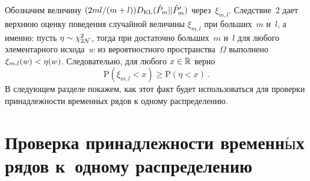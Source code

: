 \begin{multicols}{2}
Обозначим величину $(2ml/(m+l))D_{\mathrm{KL}}(\hat{P}_m||\hat{P}'_m)$ через~$\xi_{m,l}$.
Следствие~2 дает верхнюю оценку поведения случайной величины $\xi_{m,l}$ при
больших~$m$ и~$l$, а именно: пусть $\eta\hm\sim \chi_{2\mathcal{N}}^2$, тогда при
достаточно больших~$m$ и~$l$ для любого элементарного исхода~$w$
из вероятностного пространства~$\Omega$ выполнено  $\xi_{m,l}(w) \hm< \eta(w)$.
Следовательно, для любого $x\hm\in\mathbb{R}$ верно
\begin{equation}
\label{eq:KLchi}
\mathrm{P}(\xi_{m,l} < x) \geq \mathrm{P}(\eta < x)\,.
\end{equation}
В следующем разделе покажем, как этот факт будет использоваться для
проверки принадлежности временн$\acute{\mbox{ы}}$х рядов к одному распределению.




\section{Проверка принадлежности временн$\acute{\mbox{ы}}$х рядов к~одному распределению}


\end{multicols}
